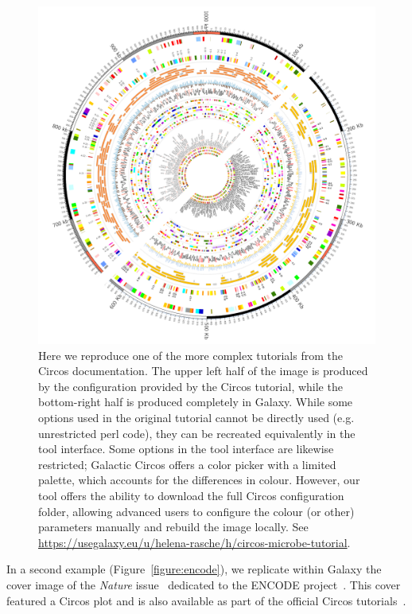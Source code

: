 \begin{figure}[h!]
\centering
\includegraphics[width=0.8\linewidth]{chapters/images/circos/plot-microbe-both.png}
	\caption{Here we reproduce one of the more complex tutorials from the Circos documentation. The upper left half of the image is produced by the configuration provided by the Circos tutorial, while the bottom-right half is produced completely in Galaxy. While some options used in the original tutorial cannot be directly used (e.g. unrestricted perl code), they can be recreated equivalently in the tool interface. Some options in the tool interface are likewise restricted; Galactic Circos offers a color picker with a limited palette, which accounts for the differences in colour. However, our tool offers the ability to download the full Circos configuration folder, allowing advanced users to configure the colour (or other) parameters manually and rebuild the image locally. See \url{https://usegalaxy.eu/u/helena-rasche/h/circos-microbe-tutorial}.}\label{figure:microbe}
\end{figure}

In a second example (Figure~\ref{figure:encode}), we replicate within Galaxy the cover image of the \emph{Nature} issue~\cite{nature-encode} dedicated to the ENCODE project~\cite{encode2004encode}. This cover featured a Circos plot and is also available as part of the official Circos tutorials~\cite{circos-nature-example}.

